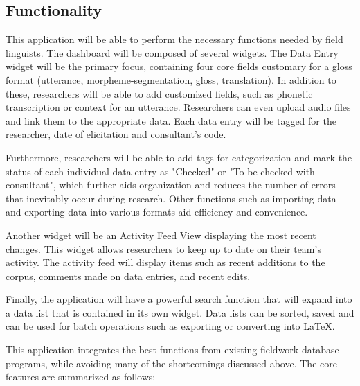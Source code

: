 \documentclass[12 pt]{article}
\begin{document}
\subsection{Functionality}

This application will be able to perform the necessary functions needed by field linguists. The dashboard will be composed of several widgets. The Data Entry widget will be the primary focus, containing four core fields customary for a gloss format (utterance, morpheme-segmentation, gloss, translation). In addition to these, researchers will be able to add customized fields, such as phonetic transcription or context for an utterance.  Researchers can even upload audio files and link them to the appropriate data. Each data entry will be tagged for the researcher, date of elicitation and consultant's code. 

Furthermore, researchers will be able to add tags for categorization and mark the status of each individual data entry as "Checked" or "To be checked with consultant", which further aids organization and reduces the number of errors that inevitably occur during research. Other functions such as importing data and exporting data into various formats aid efficiency and convenience. 

Another widget will be an Activity Feed View displaying the most recent changes. This widget allows researchers to keep up to date on their team's activity.  The activity feed will display items such as recent additions to the corpus, comments made on data entries, and recent edits. 

Finally, the application will have a powerful search function that will expand into a data list that is contained in its own widget. Data lists can be sorted, saved and can be used for batch operations such as exporting or converting into LaTeX. 

This application integrates the best functions from existing fieldwork database programs, while avoiding many of the shortcomings discussed above. The core features are summarized as follows: 
\end{document}
